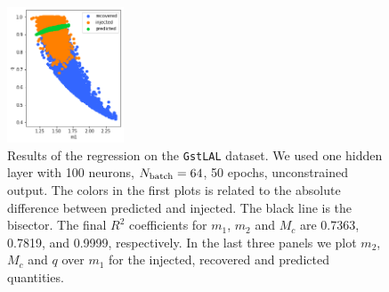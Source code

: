 \documentclass[prd,aps,twocolumn,a4paper,showkeys,nofootinbib]{revtex4-1}
\begin{document}
\begin{figure}[t]
  \includegraphics[width=0.31\textwidth]{./Figs/GstLAL_q.png}
  \caption{\label{fig:GstLAL_results} Results of the regression on the \texttt{GstLAL}
  dataset. We used one hidden layer with 100 neurons, $N_{\rm batch}=64$, 50 epochs,  
  unconstrained output.
  The colors in the first plots is related to the absolute difference between predicted 
  and injected. The black line is the bisector.
  The final $R^2$ coefficients for $m_1$, $m_2$ and $M_c$ 
  are 0.7363, 0.7819, and 0.9999, respectively.
  In the last three panels we plot $m_2$, $M_c$ and $q$ over $m_1$ for the injected, recovered
  and predicted quantities.}
\end{figure}

\end{document}
